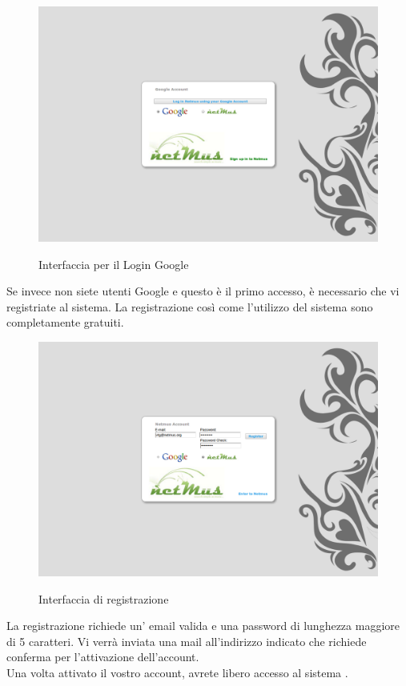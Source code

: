 \begin{figure}[htbp]
  \centering
  \includegraphics[width=15cm]{img/MU/loginGoogle.png}\\
\caption{Interfaccia per il Login Google}
\end{figure}

Se invece non siete utenti Google e questo
\`e il primo accesso, \`e necessario che vi registriate al sistema. La
registrazione cos\`i come l'utilizzo del sistema  sono completamente
gratuiti.\\
\begin{figure}[htbp]
  \centering
  \includegraphics[width=15cm]{img/MU/registration.png}\\
\caption{Interfaccia di registrazione}
\end{figure}

La registrazione richiede un' email valida e una password di lunghezza maggiore
di 5 caratteri. Vi verr\`a inviata una mail all'indirizzo indicato che richiede
conferma per l'attivazione dell'account.\\
Una volta attivato il vostro account, avrete libero accesso al sistema
.

